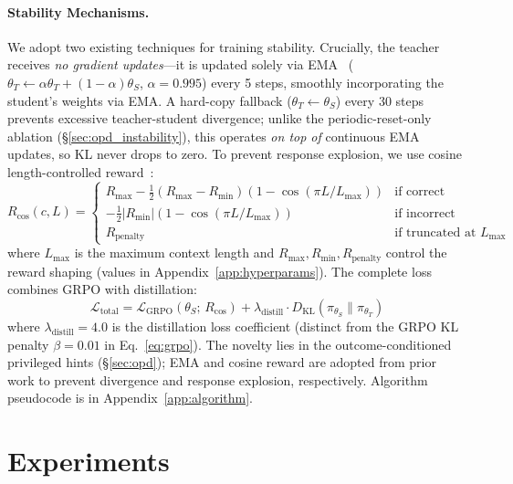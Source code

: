 \documentclass{article}
\begin{document}
\paragraph{Stability Mechanisms.}
We adopt two existing techniques for training stability. Crucially, the teacher receives \emph{no gradient updates}---it is updated solely via EMA~\citep{tarvainen2017meanteacher} ($\theta_T \leftarrow \alpha \theta_T + (1-\alpha)\theta_S$, $\alpha{=}0.995$) every 5 steps, smoothly incorporating the student's weights via EMA. A hard-copy fallback ($\theta_T \leftarrow \theta_S$) every 30 steps prevents excessive teacher-student divergence; unlike the periodic-reset-only ablation (\S\ref{sec:opd_instability}), this operates \emph{on top of} continuous EMA updates, so KL never drops to zero. To prevent response explosion, we use cosine length-controlled reward~\citep{yeo2025cosine}:
\begin{equation}
    R_{\text{cos}}(c, L) = \begin{cases}
        R_{\text{max}} - \frac{1}{2}(R_{\text{max}} - R_{\text{min}})(1 - \cos(\pi L / L_{\text{max}})) & \text{if correct} \\[3pt]
        -\frac{1}{2}|R_{\text{min}}|(1 - \cos(\pi L / L_{\text{max}})) & \text{if incorrect} \\[3pt]
        R_{\text{penalty}} & \text{if truncated at } L_{\text{max}}
    \end{cases}
\label{eq:cosine_reward}
\end{equation}
where $L_{\text{max}}$ is the maximum context length and $R_{\text{max}}, R_{\text{min}}, R_{\text{penalty}}$ control the reward shaping (values in Appendix~\ref{app:hyperparams}). The complete loss combines GRPO with distillation:
\begin{equation}
    \mathcal{L}_{\text{total}} = \mathcal{L}_{\text{GRPO}}(\theta_S;\, R_{\text{cos}}) + \lambda_{\text{distill}} \cdot D_\text{KL}\!\left(\pi_{\theta_S} \| \pi_{\theta_T}\right)
    \label{eq:full_objective}
\end{equation}
where $\lambda_{\text{distill}}{=}4.0$ is the distillation loss coefficient (distinct from the GRPO KL penalty $\beta{=}0.01$ in Eq.~\ref{eq:grpo}).
The novelty lies in the outcome-conditioned privileged hints (\S\ref{sec:opd}); EMA and cosine reward are adopted from prior work to prevent divergence and response explosion, respectively. Algorithm pseudocode is in Appendix~\ref{app:algorithm}.


\section{Experiments}
\label{sec:eval}
\end{document}
